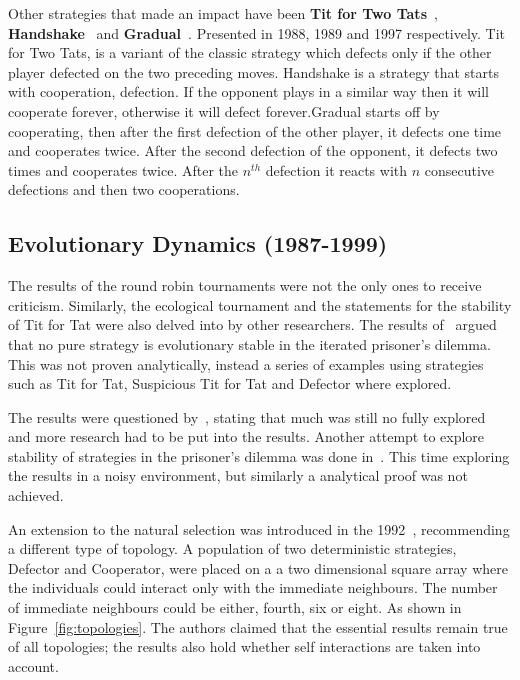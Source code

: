 \documentclass{article}
\begin{document}
Other strategies that made an impact have been \textbf{Tit for Two Tats}~\cite{Axelrod1988},
\textbf{Handshake}~\cite{Robson1989} and \textbf{Gradual}~\cite{Beaufils1997}.
Presented in 1988, 1989 and 1997 respectively. Tit for Two Tats, is a variant
of the classic strategy which defects only if the other player defected on the
two preceding moves. Handshake is a strategy that starts with cooperation,
defection. If the opponent plays in a similar way then it will cooperate forever,
otherwise it will defect forever.Gradual starts off by cooperating, then after
the first defection of the other player, it defects one time and cooperates twice.
After the second defection of the opponent, it defects two times and cooperates
twice. After the \(n^{th}\) defection it reacts with \(n\) consecutive defections
and then two cooperations. 

\subsection{Evolutionary Dynamics (1987-1999)}

The results of the round robin tournaments were not the only ones to receive
criticism. Similarly, the ecological tournament and the statements for
the stability of Tit for Tat were also delved into by other researchers.
The results of~\cite{Boyd1987} argued that no pure strategy is evolutionary
stable in the iterated prisoner's dilemma. This was not proven analytically,
instead a series of examples using strategies such as Tit for Tat, Suspicious
Tit for Tat and Defector where explored.

The results were questioned by~\cite{May1987}, stating that much was
still no fully explored and more research had to be put into the results.
Another attempt to explore stability of strategies in the prisoner's dilemma
was done in~\cite{Boyd1989}. This time exploring the results in a noisy
environment, but similarly a analytical proof was not achieved.

An extension to the natural selection was introduced in the 1992~\cite{Nowak1992b},
recommending a different type of topology. A population of two deterministic
strategies, Defector and Cooperator, were placed on a a two dimensional square array
where the individuals could interact only with the immediate neighbours.
The number of immediate neighbours could be either, fourth, six or eight. As
shown in Figure~\ref{fig:topologies}. The authors claimed that the essential
results remain true of all topologies; the results also hold whether self interactions
are taken into account.
\end{document}
